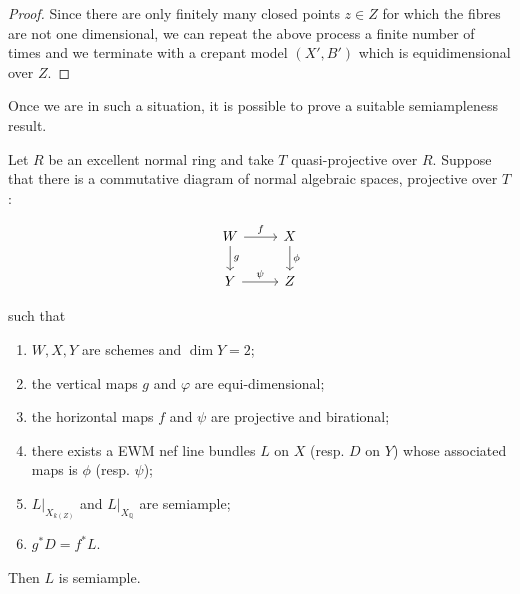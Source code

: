 \begin{proof}
		Since there are only finitely many closed points $z \in Z$ for which the fibres are not one dimensional, we can repeat the above process a finite number of times and we terminate with a crepant model $(X',B')$ which is equidimensional over $Z$.	
	\end{proof}
	
	Once we are in such a situation, it is possible to prove a suitable semiampleness result.
	
	\begin{proposition}\label{EDsemiampleness2}
		Let $R$ be an excellent normal ring and take $T$ quasi-projective over $R$. Suppose that there is a commutative diagram of normal algebraic spaces, projective over $T$:
		
		\[\begin{tikzcd}
		W \arrow[d, "g"] \arrow[r, "f"] & X \arrow[d, "\phi"] \\
		Y \arrow[r, "\psi"]             & Z                  
		\end{tikzcd}\]
		
		such that
		
		\begin{enumerate}
			\item $W,X,Y$ are schemes and $\dim Y =2$;
			\item the vertical maps $g$ and $\varphi$ are equi-dimensional;
			\item the horizontal maps $f$ and $\psi$ are projective and birational;
			\item there exists a EWM nef line bundles $L$ on $X$ (resp.  $D$ on $Y$) whose associated maps is $\phi$ (resp. $\psi$);
			\item $L|_{X_{k(Z)}}$ and $L|_{X_\mathbb{Q}}$ are semiample;
			\item $g^{*}D=f^{*}L$.
		\end{enumerate}
		
		Then $L$ is semiample.
	\end{proposition}
	
